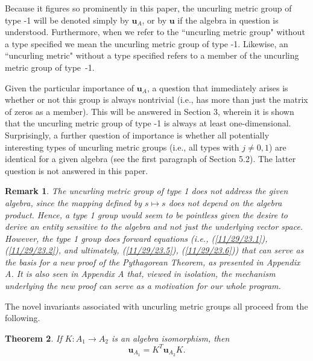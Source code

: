 \documentclass{amsart}
\numberwithin{equation}{section}
\newtheorem{theorem}{Theorem}
\newtheorem{remark}[theorem]{Remark}
\theoremstyle{definition}
\numberwithin{theorem}{section}
\begin{document}
   
Because it figures so prominently in this paper, the uncurling metric group of type -1 will be denoted simply by $\mathbf{u}_A$, or by $\mathbf{u}$ if the algebra in question is understood.  Furthermore, when we refer to the ``uncurling metric group" without a type specified we mean the uncurling metric group of type -1.  Likewise, an ``uncurling metric" without a type specified refers to a member of the uncurling metric group of \mbox{type -1}. 
 
      Given the particular importance of $\mathbf{u}_A$, a question that immediately arises is whether or not this group is always nontrivial (i.e., has more than just the matrix of zeros as a member).  This will be answered in Section 3, wherein it is shown that the uncurling metric group of type -1 is always at least one-dimensional.  Surprisingly, a further question of importance is whether all potentially interesting types of uncurling metric groups (i.e., all types with $j\ne 0,1$) are identical for a given algebra (see the first paragraph of Section 5.2).  The latter question is not answered in this paper.

\begin{remark}\label{11/21/23.1} {\rm The uncurling metric group of type 1 does not address the given algebra, since the mapping defined by $s\mapsto s$ does not depend on the algebra product.  Hence, a type 1 group would seem to be pointless given the desire to derive an entity sensitive to the algebra and not just the underlying vector space.  However, the type 1 group does forward equations (i.e., (\ref{11/29/23.1}), (\ref{11/29/23.2}), and ultimately, (\ref{11/29/23.5}), (\ref{11/29/23.6})) that can serve as the basis for a new proof of the Pythagorean Theorem, as presented in Appendix A.  It is also seen in Appendix A that, viewed in isolation, the mechanism underlying the new proof can serve as a motivation for our whole program.}\end{remark}

\enlargethispage{1cm}

The novel invariants associated with uncurling metric groups all proceed from the following.


\begin{theorem} \label{6/6/23.1} If $K:A_1\rightarrow A_2$ is an algebra isomorphism, then \begin{equation}\label{5/23/23.1} \mathbf{u}_{A_1} = K^T \mathbf{u}_{A_2} K. \end{equation} \end{theorem}
\end{document}

